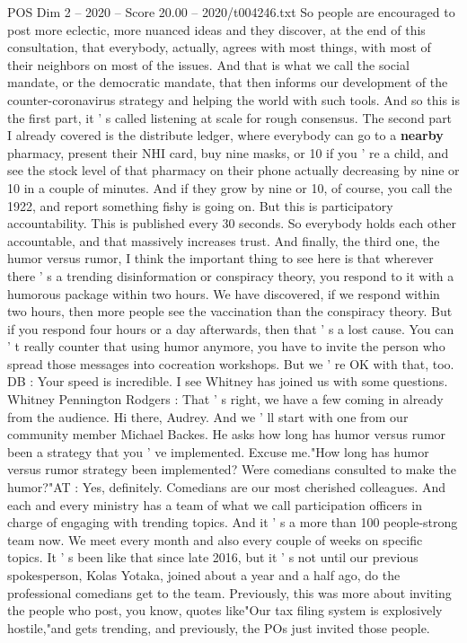 \begin{textsample}{POS Dim 2 – 2020 – Score 20.00 – 2020/t004246.txt}
So people are encouraged to post more eclectic, more nuanced ideas and they discover, at the end of this consultation, that everybody, actually, agrees with most things, with most of their neighbors on most of the issues.
And that is what we call the social mandate, or the democratic mandate, that then informs our development of the counter-coronavirus strategy and helping the world with such tools.
And so this is the first part, it ' s called listening at scale for rough consensus.
The second part I already covered is the distribute ledger, where everybody can go to a \textbf{nearby} pharmacy, present their NHI card, buy nine masks, or 10 if you ' re a child, and see the stock level of that pharmacy on their phone actually decreasing by nine or 10 in a couple of minutes.
And if they grow by nine or 10, of course, you call the 1922, and report something fishy is going on.
But this is participatory accountability.
This is published every 30 seconds.
So everybody holds each other accountable, and that massively increases trust.
And finally, the third one, the humor versus rumor, I think the important thing to see here is that wherever there ' s a trending disinformation or conspiracy theory, you respond to it with a humorous package within two hours.
We have discovered, if we respond within two hours, then more people see the vaccination than the conspiracy theory.
But if you respond four hours or a day afterwards, then that ' s a lost cause.
You can ' t really counter that using humor anymore, you have to invite the person who spread those messages into cocreation workshops.
But we ' re OK with that, too.
DB : Your speed is incredible.
I see Whitney has joined us with some questions.
Whitney Pennington Rodgers : That ' s right, we have a few coming in already from the audience.
Hi there, Audrey.
And we ' ll start with one from our community member Michael Backes.
He asks how long has humor versus rumor been a strategy that you ' ve implemented.
Excuse me."How long has humor versus rumor strategy been implemented?
Were comedians consulted to make the humor?"AT : Yes, definitely.
Comedians are our most cherished colleagues.
And each and every ministry has a team of what we call participation officers in charge of engaging with trending topics.
And it ' s a more than 100 people-strong team now.
We meet every month and also every couple of weeks on specific topics.
It ' s been like that since late 2016, but it ' s not until our previous spokesperson, Kolas Yotaka, joined about a year and a half ago, do the professional comedians get to the team.
Previously, this was more about inviting the people who post, you know, quotes like"Our tax filing system is explosively hostile,"and gets trending, and previously, the POs just invited those people.

\end{textsample}
